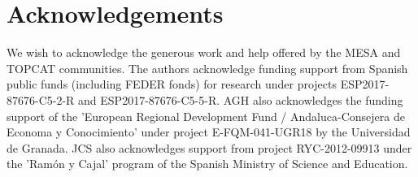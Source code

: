 \documentclass[fleqn,usenatbib]{mnras}
\begin{document}




\section*{Acknowledgements}
We wish to acknowledge the generous work and help offered by the MESA and TOPCAT communities. The authors acknowledge funding support from Spanish public funds (including FEDER fonds) for research under projects ESP2017-87676-C5-2-R and ESP2017-87676-C5-5-R. AGH also acknowledges the funding support of the 'European Regional Development Fund / Andaluca-Consejera de Economa y Conocimiento' under project E-FQM-041-UGR18 by the Universidad de Granada. JCS also acknowledges support from project RYC-2012-09913 under the 'Ram\'on y Cajal' program of the Spanish Ministry of Science and Education.
\end{document}
